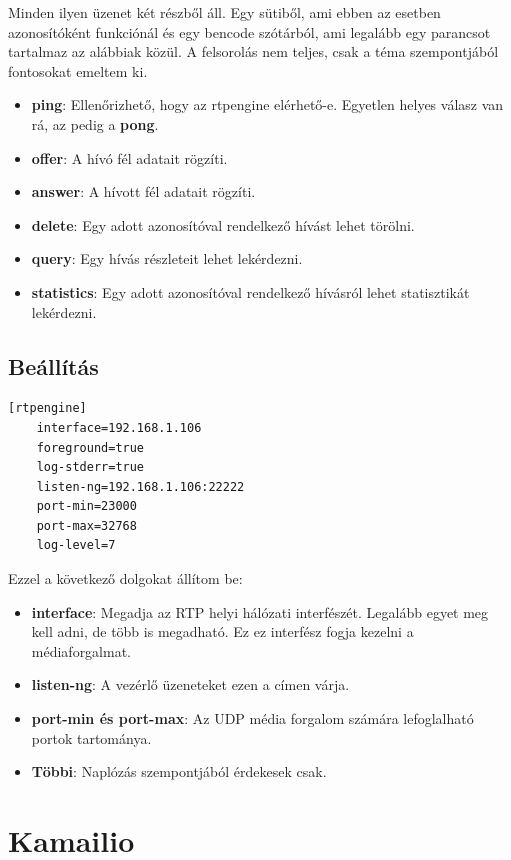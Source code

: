 Minden ilyen üzenet két részből áll. Egy sütiből, ami ebben az esetben azonosítóként
funkciónál és egy bencode szótárból, ami legalább egy parancsot tartalmaz az 
alábbiak közül. A felsorolás nem teljes, csak a téma szempontjából fontosokat 
emeltem ki.

\begin{itemize}
	\item \textbf{ping}: Ellenőrizhető, hogy az rtpengine elérhető-e. Egyetlen helyes 
	válasz van rá, az pedig a \textbf{pong}.
	\item \textbf{offer}: A hívó fél adatait rögzíti.
	\item \textbf{answer}: A hívott fél adatait rögzíti. 
	\item \textbf{delete}: Egy adott azonosítóval rendelkező hívást lehet törölni.
	\item \textbf{query}: Egy hívás részleteit lehet lekérdezni. 
	\item \textbf{statistics}: Egy adott azonosítóval rendelkező hívásról lehet statisztikát
	lekérdezni. 
\end{itemize} 

\subsection{Beállítás}

\begin{lstlisting}[caption=rtpengine konfigurációja, label=lst:confRtpe]
	[rtpengine]
	interface=192.168.1.106
	foreground=true
	log-stderr=true
	listen-ng=192.168.1.106:22222
	port-min=23000
	port-max=32768
	log-level=7
\end{lstlisting}

Ezzel a következő dolgokat állítom be: 

\begin{itemize}
	\item \textbf{interface}: Megadja az RTP helyi hálózati interfészét. Legalább
	egyet meg kell adni, de több is megadható. Ez ez interfész fogja kezelni a 
	médiaforgalmat. 
	\item \textbf{listen-ng}: A vezérlő üzeneteket ezen a címen várja. 
	\item \textbf{port-min és port-max}: Az UDP média forgalom számára lefoglalható
	portok tartománya. 
	\item \textbf{Többi}: Naplózás szempontjából érdekesek csak. 
\end{itemize}

\section{Kamailio}

